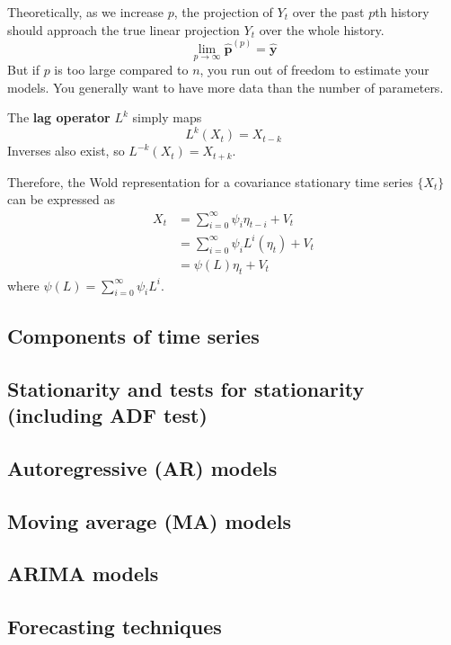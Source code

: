 \documentclass{article}
\begin{document}
    Theoretically, as we increase $p$, the projection of $Y_t$ over the past $p$th history should approach the true linear projection $Y_t$ over the whole history. 
    \begin{equation}
      \lim_{p \rightarrow \infty} \hat{\mathbf{p}}^{(p)} = \hat{\mathbf{y}}
    \end{equation}
    But if $p$ is too large compared to $n$, you run out of freedom to estimate your models. You generally want to have more data than the number of parameters. 

    \begin{definition}
      The \textbf{lag operator} $L^k$ simply maps 
      \begin{equation}
        L^k (X_t)= X_{t-k}
      \end{equation}
      Inverses also exist, so $L^{-k} (X_t) = X_{t+k}$. 
    \end{definition}

    Therefore, the Wold representation for a covariance stationary time series $\{X_t\}$ can be expressed as 
    \begin{align}
      X_t & = \sum_{i=0}^\infty \psi_i \eta_{t-i} + V_t \\
          & = \sum_{i=0}^\infty \psi_i L^i (\eta_{t}) + V_t \\
          & = \psi(L) \eta_t + V_t 
    \end{align}
    where $\psi(L) = \sum_{i=0}^\infty \psi_i L^i$. 

  \subsection{Components of time series}

  \subsection{Stationarity and tests for stationarity (including ADF test)}

  \subsection{Autoregressive (AR) models}

  \subsection{Moving average (MA) models}

  \subsection{ARIMA models}

  \subsection{Forecasting techniques}




\end{document}
